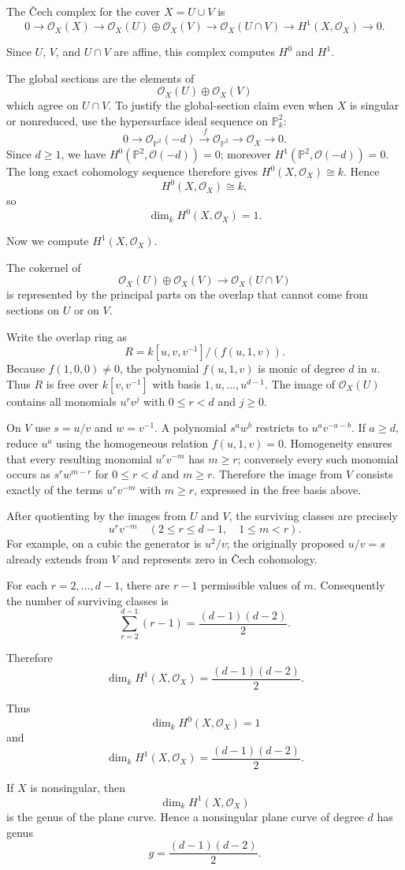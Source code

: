 The \v{C}ech complex for the cover \(X=U\cup V\) is
\[
0
\longrightarrow
\mathcal O_X(X)
\longrightarrow
\mathcal O_X(U)\oplus\mathcal O_X(V)
\longrightarrow
\mathcal O_X(U\cap V)
\longrightarrow
H^1(X,\mathcal O_X)
\longrightarrow0.
\]

Since \(U\), \(V\), and \(U\cap V\) are affine, this complex computes
\(H^0\) and \(H^1\).

The global sections are the elements of
\[
\mathcal O_X(U)\oplus\mathcal O_X(V)
\]
which agree on \(U\cap V\). To justify the global-section claim even when $X$ is singular or
nonreduced, use the hypersurface ideal sequence on $\mathbb P^2_k$:
\[
0\longrightarrow\mathcal O_{\mathbb P^2}(-d)
\xrightarrow{\cdot f}\mathcal O_{\mathbb P^2}
\longrightarrow\mathcal O_X\longrightarrow0.
\]
Since $d\ge1$, we have $H^0(\mathbb P^2,\mathcal O(-d))=0$;
moreover $H^1(\mathbb P^2,\mathcal O(-d))=0$.
The long exact cohomology sequence therefore gives
$H^0(X,\mathcal O_X)\cong k$. Hence
\[
H^0(X,\mathcal O_X)\cong k,
\]
so
\[
\boxed{
	\dim_k H^0(X,\mathcal O_X)=1.
}
\]

Now we compute \(H^1(X,\mathcal O_X)\).

The cokernel of
\[
\mathcal O_X(U)\oplus\mathcal O_X(V)
\longrightarrow
\mathcal O_X(U\cap V)
\]
is represented by the principal parts on the overlap that cannot come from
sections on \(U\) or on \(V\).

Write the overlap ring as
\[
R=k[u,v,v^{-1}]/(f(u,1,v)).
\]
Because $f(1,0,0)\ne0$, the polynomial $f(u,1,v)$ is monic
of degree $d$ in $u$. Thus $R$ is free over $k[v,v^{-1}]$
with basis $1,u,\ldots,u^{d-1}$.
The image of $\mathcal O_X(U)$ contains all monomials
$u^r v^j$ with $0\le r<d$ and $j\ge0$.

On $V$ use $s=u/v$ and $w=v^{-1}$. A polynomial
$s^a w^b$ restricts to $u^a v^{-a-b}$. If $a\ge d$,
reduce $u^a$ using the homogeneous relation $f(u,1,v)=0$.
Homogeneity ensures that every resulting monomial $u^r v^{-m}$
has $m\ge r$; conversely every such monomial occurs as
$s^r w^{m-r}$ for $0\le r<d$ and $m\ge r$.
Therefore the image from $V$ consists exactly of the terms
$u^r v^{-m}$ with $m\ge r$, expressed in the free basis above.

After quotienting by the images from $U$ and $V$, the surviving
classes are precisely
\[
\boxed{u^r v^{-m}\quad (2\le r\le d-1,\quad1\le m<r).}
\]
For example, on a cubic the generator is $u^2/v$;
the originally proposed $u/v=s$ already extends from $V$
and represents zero in \v{C}ech cohomology.

For each $r=2,\ldots,d-1$, there are $r-1$ permissible
values of $m$. Consequently the number of surviving classes is
\[
\sum_{r=2}^{d-1}(r-1)
=\frac{(d-1)(d-2)}2.
\]

Therefore
\[
\dim_k H^1(X,\mathcal O_X)
=
\frac{(d-1)(d-2)}2.
\]

Thus
\[
\boxed{
	\dim_k H^0(X,\mathcal O_X)=1
}
\]
and
\[
\boxed{
	\dim_k H^1(X,\mathcal O_X)=\frac{(d-1)(d-2)}2.
}
\]

If \(X\) is nonsingular, then
\[
\dim_k H^1(X,\mathcal O_X)
\]
is the genus of the plane curve. Hence a nonsingular plane curve of degree
\(d\) has genus
\[
\boxed{
	g=\frac{(d-1)(d-2)}2.
}
\]
